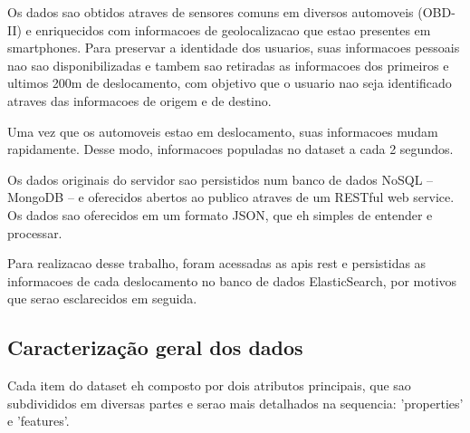 \documentclass[10pt, conference]{IEEEtran}
\begin{document}
Os dados sao obtidos atraves de sensores comuns em diversos
automoveis (OBD-II) e enriquecidos com informacoes de geolocalizacao
que estao presentes em smartphones. Para preservar a identidade
dos usuarios, suas informacoes pessoais nao sao disponibilizadas e tambem
sao retiradas as informacoes dos primeiros e ultimos 200m de deslocamento,
com objetivo que o usuario nao seja identificado atraves das informacoes
de origem e de destino. 

Uma vez que os automoveis estao em deslocamento, suas informacoes mudam
rapidamente. Desse modo, informacoes populadas no dataset a cada 2 segundos.

Os dados originais do servidor sao persistidos num banco de dados NoSQL -- 
MongoDB -- e oferecidos abertos ao publico atraves de um RESTful web service.
Os dados sao oferecidos em um formato JSON, que eh simples de entender e processar.

Para realizacao desse trabalho, foram acessadas as apis rest e persistidas
as informacoes de cada deslocamento no banco de dados ElasticSearch, por 
motivos que serao esclarecidos em seguida. 



\subsection{Caracterização geral dos dados}

Cada item do dataset eh composto por dois atributos principais, que sao subdivididos
em diversas partes e serao mais detalhados na sequencia: 'properties' e 'features'. 
\end{document}
